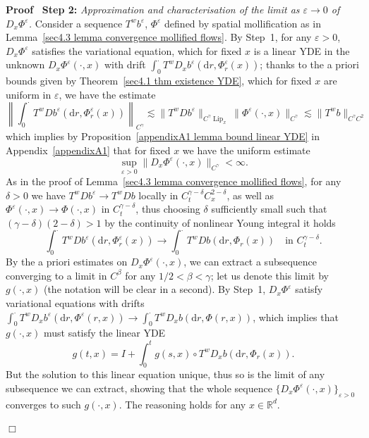 \documentclass[10pt]{article}
\newcommand{\mathd}{\mathrm{d}}
\newcommand{\nobracket}{}
\newcommand{\tmop}[1]{\ensuremath{\operatorname{#1}}}
\newcommand{\tmstrong}[1]{\textbf{#1}}
\newcommand{\tmtextit}[1]{{\itshape{#1}}}
\newenvironment{proof}{\noindent\textbf{Proof\ }}{\hspace*{\fill}$\Box$\medskip}
\begin{document}
\begin{proof}
  {\tmstrong{Step 2:}} \tmtextit{Approximation and characterisation of the
  limit as $\varepsilon \rightarrow 0$ of $D_x \Phi^{\varepsilon}$.} Consider
  a sequence $T^w b^{\varepsilon}$, $\Phi^{\varepsilon}$ defined by spatial
  mollification as in Lemma~\ref{sec4.3 lemma convergence mollified flows}. By
  Step~1, for any $\varepsilon > 0$, $D_x \Phi^{\varepsilon}$ satisfies the
  variational equation, which for fixed $x$ is a linear YDE in the unknown
  $D_x \Phi^{\varepsilon} (\cdot, x)$ with drift $\int_0^{\cdot} T^w D_x
  b^{\varepsilon} (\mathd r, \Phi^{\varepsilon}_r (x))$; thanks to the a
  priori bounds given by Theorem~\ref{sec4.1 thm existence YDE}, which for
  fixed $x$ are uniform in $\varepsilon$, we have the estimate
  \[ \left\| \int_0^{\cdot} T^w D b^{\varepsilon} (\mathd r,
     \Phi^{\varepsilon}_r (x)) \right\|_{C^{\gamma}} \lesssim \| T^w D
     b^{\varepsilon} \|_{C^{\gamma} \tmop{Lip}_x}  \| \Phi^{\varepsilon}
     (\cdot, x) \|_{C^{\gamma}} \lesssim \| T^w b \|_{C^{\gamma} C^2} \]
  which implies by Proposition~\ref{appendixA1 lemma bound linear YDE} in
  Appendix~\ref{appendixA1} that for fixed $x$ we have the uniform estimate
  \[ \sup_{\varepsilon > 0} \| D_x \Phi^{\varepsilon} (\cdot, x)
     \|_{C^{\gamma}} < \infty . \]
  As in the proof of Lemma~\ref{sec4.3 lemma convergence mollified flows}, for
  any $\delta > 0$ we have $T^w D b^{\varepsilon} \rightarrow T^w D b$ locally
  in $C^{\gamma - \delta}_t C^{2 - \delta}_x$, as well as $\Phi^{\varepsilon}
  (\cdot, x) \rightarrow \Phi (\cdot, x)$ in $C^{\gamma - \delta}_t$, thus
  choosing $\delta$ sufficiently small such that $(\gamma - \delta) (2 -
  \delta) > 1$ by the continuity of nonlinear Young integral it holds
  \[ \int_0^{\cdot} T^w D b^{\varepsilon} (\mathd r, \Phi^{\varepsilon}_r (x))
     \rightarrow \int_0^{\cdot} T^w D b (\mathd r, \Phi_r (x)) \quad \text{in
     } C^{\gamma - \delta}_t . \]
  By the a priori estimates on $D_x \Phi^{\varepsilon} (\cdot, x)$, we can
  extract a subsequence converging to a limit in $C^{\beta}$ for any $1 / 2 <
  \beta < \gamma$; let us denote this limit by $g (\cdot, x)$ (the notation
  will be clear in a second). By Step~1, $D_x \Phi^{\varepsilon}$ satisfy
  variational equations with drifts $\int_0^{\cdot} T^w D_x b^{\varepsilon}
  (\mathd r, \Phi^{\varepsilon} (r, x)) \rightarrow \int_0^{\cdot} T^w D_x b
  (\mathd r, \Phi (r, x))$, which implies that $g (\cdot, x)$ must satisfy the
  linear YDE
  \[ g (t, x) = I + \int_0^t g (s, x) \circ \nobracket T^w D_x b (\mathd r,
     \Phi_r (x) \nobracket) . \]
  But the solution to this linear equation unique, thus so is the limit of any
  subsequence we can extract, showing that the whole sequence $\{ D_x
  \Phi^{\varepsilon} (\cdot, x) \}_{\varepsilon > 0}$ converges to such $g
  (\cdot, x)$. The reasoning holds for any $x \in \mathbb{R}^d$.
  

\end{proof}
\end{document}
